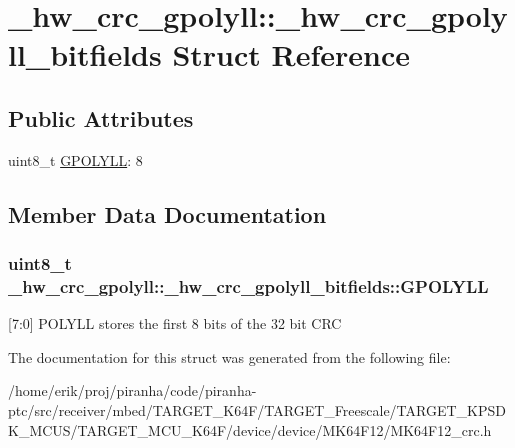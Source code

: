 \hypertarget{struct__hw__crc__gpolyll_1_1__hw__crc__gpolyll__bitfields}{}\section{\+\_\+hw\+\_\+crc\+\_\+gpolyll\+:\+:\+\_\+hw\+\_\+crc\+\_\+gpolyll\+\_\+bitfields Struct Reference}
\label{struct__hw__crc__gpolyll_1_1__hw__crc__gpolyll__bitfields}
\subsection*{Public Attributes}
\begin{DoxyCompactItemize}
\item 
uint8\+\_\+t \hyperlink{struct__hw__crc__gpolyll_1_1__hw__crc__gpolyll__bitfields_a9daeeafa92a33d374c93dbdf0e00f3d8}{G\+P\+O\+L\+Y\+LL}\+: 8
\end{DoxyCompactItemize}


\subsection{Member Data Documentation}
\subsubsection[{\texorpdfstring{G\+P\+O\+L\+Y\+LL}{GPOLYLL}}]{\setlength{\rightskip}{0pt plus 5cm}uint8\+\_\+t \+\_\+hw\+\_\+crc\+\_\+gpolyll\+::\+\_\+hw\+\_\+crc\+\_\+gpolyll\+\_\+bitfields\+::\+G\+P\+O\+L\+Y\+LL}\hypertarget{struct__hw__crc__gpolyll_1_1__hw__crc__gpolyll__bitfields_a9daeeafa92a33d374c93dbdf0e00f3d8}{}\label{struct__hw__crc__gpolyll_1_1__hw__crc__gpolyll__bitfields_a9daeeafa92a33d374c93dbdf0e00f3d8}
\mbox{[}7\+:0\mbox{]} P\+O\+L\+Y\+LL stores the first 8 bits of the 32 bit C\+RC 

The documentation for this struct was generated from the following file\+:\begin{DoxyCompactItemize}
\item 
/home/erik/proj/piranha/code/piranha-\/ptc/src/receiver/mbed/\+T\+A\+R\+G\+E\+T\+\_\+\+K64\+F/\+T\+A\+R\+G\+E\+T\+\_\+\+Freescale/\+T\+A\+R\+G\+E\+T\+\_\+\+K\+P\+S\+D\+K\+\_\+\+M\+C\+U\+S/\+T\+A\+R\+G\+E\+T\+\_\+\+M\+C\+U\+\_\+\+K64\+F/device/device/\+M\+K64\+F12/M\+K64\+F12\+\_\+crc.\+h\end{DoxyCompactItemize}
